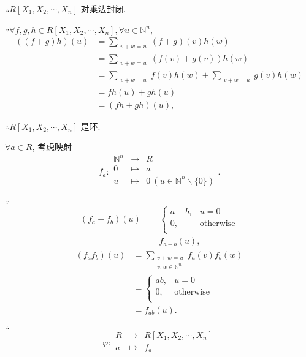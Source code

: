 \documentclass[color=black,device=normal,lang=cn,mode=geye]{elegantnote}
\begin{document}
$\therefore R[X_1,X_2,\cdots,X_n]$ 对乘法封闭.

$\because\forall f,g,h\in R[X_1,X_2,\cdots,X_n],\forall u\in\mathbb{N}^n$,
\begin{align*}
    ((f+g)h)(u) & =\sum\limits_{\substack{v+w=u}}(f+g)(v)h(w) \\
    & =\sum\limits_{\substack{v+w=u}}(f(v)+g(v))h(w) \\
    & =\sum\limits_{\substack{v+w=u}}f(v)h(w)+\sum\limits_{\substack{v+w=u}}g(v)h(w) \\
    & =fh(u)+gh(u) \\
    & =(fh+gh)(u),
\end{align*}

$\therefore R[X_1,X_2,\cdots,X_n]$ 是环.

$\forall a\in R$, 考虑映射
\[f_a:\begin{array}{rcl}
    \mathbb{N}^n & \to & R \\
    0 & \mapsto & a \\
    u & \mapsto & 0\ (u\in\mathbb{N}^n\backslash\{0\}) \\
\end{array}.\]

$\because$
\begin{align*}
    (f_a+f_b)(u) & =\begin{cases}
                        a+b, & u=0 \\
                        0, & \text{otherwise} \\
                    \end{cases} \\
    & =f_{a+b}(u),
\end{align*}
\begin{align*}
    (f_af_b)(u) & =\sum\limits_{\substack{v+w=u\\v,w\in\mathbb{N}^n}}f_a(v)f_b(w) \\
    & =\begin{cases}
            ab, & u=0 \\
            0, & \text{otherwise} \\
        \end{cases} \\
    & =f_{ab}(u).
\end{align*}

$\therefore$
\[\varphi:\begin{array}{rcl}
    R & \to & R[X_1,X_2,\cdots,X_n] \\
    a & \mapsto & f_a \\
\end{array}\]
\end{document}
